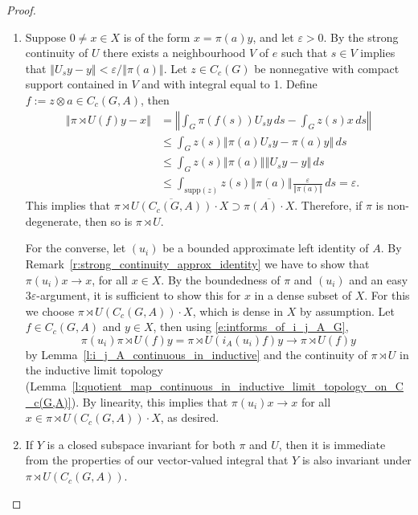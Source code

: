 \documentclass{amsart}
\theoremstyle{plain}
\theoremstyle{definition}
\numberwithin{equation}{section}
\begin{document}
\begin{proof}
\begin{enumerate}
 \item Suppose $0 \not= x \in X$ is of the form $x = \pi(a)y$, and let ${\varepsilon} > 0$. By the strong continuity of $U$ there exists a neighbourhood $V$ of $e$ such that $s \in V$ implies that ${\left\Vert {U_s y - y} \right\Vert} < {\varepsilon} / {\left\Vert {\pi(a)} \right\Vert}$. Let $z \in C_c(G)$ be nonnegative with compact support contained in $V$ and with integral equal to 1. Define $f := z \otimes a \in C_c(G,A)$, then
\begin{align*}
 {\left\Vert {{\pi \rtimes U}(f)y - x} \right\Vert} &= {\left\Vert { \int_G \pi(f(s)) U_s y {\,ds} - \int_G z(s)x {\,ds}} \right\Vert} \\
&\leq \int_G z(s) {\left\Vert {\pi(a) U_s y - \pi(a)y} \right\Vert} \,ds \\
&\leq \int_G z(s) {\left\Vert {\pi(a)} \right\Vert} {\left\Vert {U_s y - y} \right\Vert} \,ds \\
&\leq \int_{{\text{supp}}(z)} z(s) {\left\Vert {\pi(a)} \right\Vert} \frac{\varepsilon}{{\left\Vert {\pi(a)} \right\Vert}} {\,ds} = {\varepsilon}.
\end{align*}
This implies that $\overline{{\pi \rtimes U}(C_c(G,A))\cdot X} \supset \overline{\pi(A)\cdot X}$. Therefore, if $\pi$ is non-degenerate, then so is ${\pi \rtimes U}$.

For the converse, let $(u_i)$ be a bounded approximate left identity of $A$. By Remark~\ref{r:strong_continuity_approx_identity} we have to show that $\pi(u_i)x \to x$, for all $x \in X$. By the boundedness of $\pi$ and $(u_i)$ and an easy $3 {\varepsilon}$-argument, it is sufficient to show this for $x$ in a dense subset of $X$. For this we choose ${\pi \rtimes U}(C_c(G,A))\cdot X$, which is dense in $X$ by assumption. Let $f \in C_c(G,A)$ and $y \in X$, then using \eqref{e:intforms_of_i_j_A_G},
\[  \pi(u_i) {\pi \rtimes U}(f)y = {\pi \rtimes U}(i_A(u_i)f)y \to {\pi \rtimes U}(f)y \]
by Lemma~\ref{l:i_j_A_continuous_in_inductive} and the continuity of ${\pi \rtimes U}$ in the inductive limit topology (Lemma~\ref{l:quotient_map_continuous_in_inductive_limit_topology_on_C_c(G,A)}).
By linearity, this implies that  $\pi(u_i)x \to x$ for all $x\in{\pi \rtimes U}(C_c(G,A)) \cdot X$, as desired.

\item If $Y$ is a closed subspace invariant for both $\pi$ and $U$, then it is immediate from the properties of our vector-valued integral that $Y$ is also invariant under ${\pi \rtimes U}(C_c(G,A))$.


\end{enumerate}
\end{proof}
\end{document}
